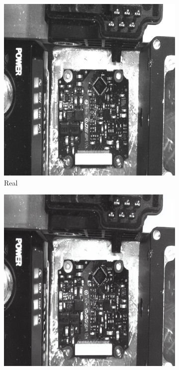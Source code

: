 \documentclass[12pt,DIV14,BCOR12mm,a4paper,footinclude=false,headinclude,parskip=half-,twoside,openright,cleardoublepage=empty,toc=index,bibliography=totoc,listof=totoc]{scrreprt}
\numberwithin{equation}{chapter}
\begin{document}
\begin{figure}
    \centering
    \begin{minipage}[H]{0.5\linewidth} %
        \centering
        \begin{subfigure}[t]{0.48\linewidth}
            \centering
            \includegraphics[width=\linewidth]{../media/pcb_real_1.png}
            \caption{Real}
        \end{subfigure}%
        \hfill
        \begin{subfigure}[t]{0.48\linewidth}
            \centering
            \includegraphics[width=\linewidth]{../media/pcb_generated_1_1.png}

\end{subfigure}
\end{minipage}
\end{figure}
\end{document}
